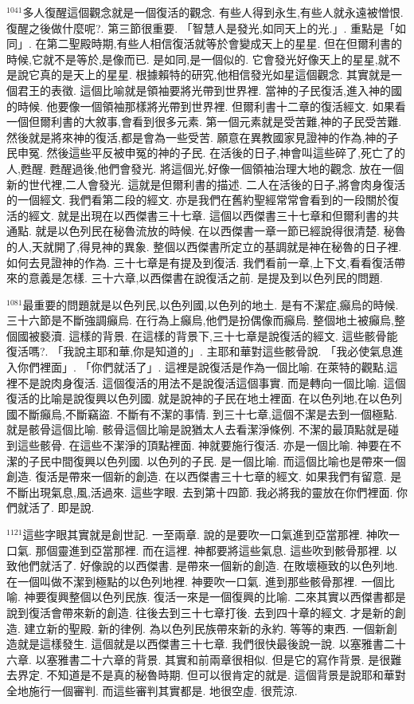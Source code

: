 \documentclass{book}
\begin{document}
$^{1041}$多人復醒這個觀念就是一個復活的觀念.
有些人得到永生,有些人就永遠被憎恨.
復醒之後做什麼呢?.
第三節很重要.
「智慧人是發光,如同天上的光.」.
重點是「如同」.
在第二聖殿時期,有些人相信復活就等於會變成天上的星星.
但在但爾利書的時候,它就不是等於,是像而已.
是如同,是一個似的.
它會發光好像天上的星星,就不是說它真的是天上的星星.
根據賴特的研究,他相信發光如星這個觀念.
其實就是一個君王的表徵.
這個比喻就是領袖要將光帶到世界裡.
當神的子民復活,進入神的國的時候.
他要像一個領袖那樣將光帶到世界裡.
但爾利書十二章的復活經文.
如果看一個但爾利書的大敘事,會看到很多元素.
第一個元素就是受苦難,神的子民受苦難.
然後就是將來神的復活,都是會為一些受苦.
願意在異教國家見證神的作為,神的子民申冤.
然後這些平反被申冤的神的子民.
在活後的日子,神會叫這些碎了,死亡了的人,甦醒.
甦醒過後,他們會發光.
將這個光,好像一個領袖治理大地的觀念.
放在一個新的世代裡,二人會發光.
這就是但爾利書的描述.
二人在活後的日子,將會肉身復活的一個經文.
我們看第二段的經文.
亦是我們在舊約聖經常常會看到的一段關於復活的經文.
就是出現在以西傑書三十七章.
這個以西傑書三十七章和但爾利書的共通點.
就是以色列民在秘魯流放的時候.
在以西傑書一章一節已經說得很清楚.
秘魯的人,天就開了,得見神的異象.
整個以西傑書所定立的基調就是神在秘魯的日子裡.
如何去見證神的作為.
三十七章是有提及到復活.
我們看前一章,上下文,看看復活帶來的意義是怎樣.
三十六章,以西傑書在說復活之前.
是提及到以色列民的問題.

$^{1081}$最重要的問題就是以色列民,以色列國,以色列的地土.
是有不潔症,癲烏的時候.
三十六節是不斷強調癲烏.
在行為上癲烏,他們是扮偶像而癲烏.
整個地土被癲烏,整個國被褻瀆.
這樣的背景.
在這樣的背景下,三十七章是說復活的經文.
這些骸骨能復活嗎?.
「我說主耶和華,你是知道的」.
主耶和華對這些骸骨說.
「我必使氣息進入你們裡面」.
「你們就活了」.
這裡是說復活是作為一個比喻.
在萊特的觀點,這裡不是說肉身復活.
這個復活的用法不是說復活這個事實.
而是轉向一個比喻.
這個復活的比喻是說復興以色列國.
就是說神的子民在地土裡面.
在以色列地,在以色列國不斷癲烏,不斷竊盜.
不斷有不潔的事情.
到三十七章,這個不潔是去到一個極點.
就是骸骨這個比喻.
骸骨這個比喻是說猶太人去看潔淨條例.
不潔的最頂點就是碰到這些骸骨.
在這些不潔淨的頂點裡面.
神就要施行復活.
亦是一個比喻.
神要在不潔的子民中間復興以色列國.
以色列的子民.
是一個比喻.
而這個比喻也是帶來一個創造.
復活是帶來一個新的創造.
在以西傑書三十七章的經文.
如果我們有留意.
是不斷出現氣息,風,活過來.
這些字眼.
去到第十四節.
我必將我的靈放在你們裡面.
你們就活了.
即是說.

$^{1121}$這些字眼其實就是創世記.
一至兩章.
說的是要吹一口氣進到亞當那裡.
神吹一口氣.
那個靈進到亞當那裡.
而在這裡.
神都要將這些氣息.
這些吹到骸骨那裡.
以致他們就活了.
好像說的以西傑書.
是帶來一個新的創造.
在敗壞極致的以色列地.
在一個叫做不潔到極點的以色列地裡.
神要吹一口氣.
進到那些骸骨那裡.
一個比喻.
神要復興整個以色列民族.
復活一來是一個復興的比喻.
二來其實以西傑書都是說到復活會帶來新的創造.
往後去到三十七章打後.
去到四十章的經文.
才是新的創造.
建立新的聖殿.
新的律例.
為以色列民族帶來新的永約.
等等的東西.
一個新創造就是這樣發生.
這個就是以西傑書三十七章.
我們很快最後說一說.
以塞雅書二十六章.
以塞雅書二十六章的背景.
其實和前兩章很相似.
但是它的寫作背景.
是很難去界定.
不知道是不是真的秘魯時期.
但可以很肯定的就是.
這個背景是說耶和華對全地施行一個審判.
而這些審判其實都是.
地很空虛.
很荒涼.
\end{document}
